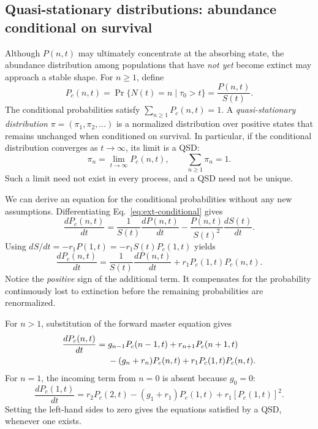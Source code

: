 \subsection{Quasi-stationary distributions: abundance conditional on survival}
\label{subsec:ext-qsd}

Although $P(n,t)$ may ultimately concentrate at the absorbing state, the
abundance distribution among populations that have \emph{not yet} become
extinct may approach a stable shape. For $n\geq1$, define
\begin{equation}
 P_c(n,t)=\Pr\{N(t)=n\mid\tau_0>t\}
          =\frac{P(n,t)}{S(t)}.
 \label{eq:ext-conditional}
\end{equation}
The conditional probabilities satisfy $\sum_{n\geq1}P_c(n,t)=1$.
A \emph{quasi-stationary distribution} $\pi=(\pi_1,\pi_2,\ldots)$
is a normalized distribution over positive states that remains unchanged
when conditioned on survival. In particular, if the conditional distribution
converges as $t\to\infty$, its limit is a QSD:
\begin{equation}
 \pi_n=\lim_{t\to\infty}P_c(n,t),\qquad
 \sum_{n\geq1}\pi_n=1.
 \label{eq:ext-qsd-def}
\end{equation}
Such a limit need not exist in every process, and a QSD need not be unique.

We can derive an equation for the conditional probabilities without any new
assumptions. Differentiating Eq.~\eqref{eq:ext-conditional} gives
\begin{equation}
 \frac{dP_c(n,t)}{dt}
 =\frac{1}{S(t)}\frac{dP(n,t)}{dt}
  -\frac{P(n,t)}{S(t)^2}\frac{dS(t)}{dt}.
 \label{eq:ext-quotient}
\end{equation}
Using $dS/dt=-r_1P(1,t)=-r_1 S(t)P_c(1,t)$ yields
\begin{equation}
 \frac{dP_c(n,t)}{dt}
 =\frac{1}{S(t)}\frac{dP(n,t)}{dt}
  +r_1P_c(1,t)P_c(n,t).
 \label{eq:ext-conditional-general}
\end{equation}
Notice the \emph{positive} sign of the additional term. It compensates
for the probability continuously lost to extinction before the remaining
probabilities are renormalized.

For $n>1$, substitution of the forward master equation gives
\begin{align}
 \frac{dP_c(n,t)}{dt}={}&
 g_{n-1}P_c(n-1,t)+r_{n+1}P_c(n+1,t)\notag\\
 &-(g_n+r_n)P_c(n,t)+r_1P_c(1,t)P_c(n,t).
 \label{eq:ext-qsd-n}
\end{align}
For $n=1$, the incoming term from $n=0$ is absent because $g_0=0$:
\begin{equation}
 \frac{dP_c(1,t)}{dt}
 =r_2P_c(2,t)-(g_1+r_1)P_c(1,t)
  +r_1[P_c(1,t)]^2.
 \label{eq:ext-qsd-one}
\end{equation}
Setting the left-hand sides to zero gives the equations satisfied by a
QSD, whenever one exists.

